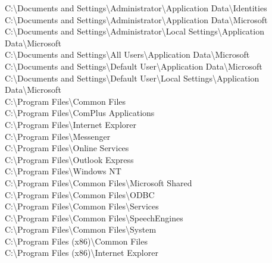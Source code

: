 \noindent C:\textbackslash Documents and Settings\textbackslash Administrator\textbackslash Application Data\textbackslash Identities \\
C:\textbackslash Documents and Settings\textbackslash Administrator\textbackslash Application Data\textbackslash Microsoft \\
C:\textbackslash Documents and Settings\textbackslash Administrator\textbackslash Local Settings\textbackslash Application Data\textbackslash Microsoft \\
C:\textbackslash Documents and Settings\textbackslash All Users\textbackslash Application Data\textbackslash Microsoft \\
C:\textbackslash Documents and Settings\textbackslash Default User\textbackslash Application Data\textbackslash Microsoft \\
C:\textbackslash Documents and Settings\textbackslash Default User\textbackslash Local Settings\textbackslash Application Data\textbackslash Microsoft \\
C:\textbackslash Program Files\textbackslash Common Files \\
C:\textbackslash Program Files\textbackslash ComPlus Applications \\
C:\textbackslash Program Files\textbackslash Internet Explorer \\
C:\textbackslash Program Files\textbackslash Messenger \\
C:\textbackslash Program Files\textbackslash Online Services \\
C:\textbackslash Program Files\textbackslash Outlook Express \\
C:\textbackslash Program Files\textbackslash Windows NT \\
C:\textbackslash Program Files\textbackslash Common Files\textbackslash Microsoft Shared \\
C:\textbackslash Program Files\textbackslash Common Files\textbackslash ODBC \\
C:\textbackslash Program Files\textbackslash Common Files\textbackslash Services \\
C:\textbackslash Program Files\textbackslash Common Files\textbackslash SpeechEngines \\
C:\textbackslash Program Files\textbackslash Common Files\textbackslash System \\
C:\textbackslash Program Files (x86)\textbackslash Common Files \\
C:\textbackslash Program Files (x86)\textbackslash Internet Explorer \\
